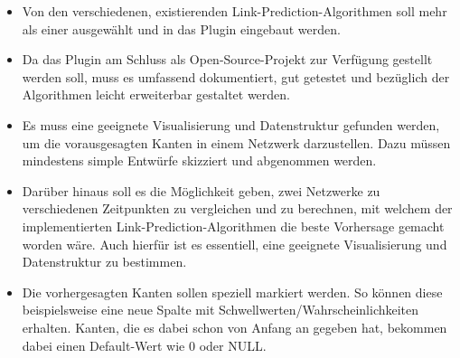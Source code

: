\begin{itemize}
    \item Von den verschiedenen, existierenden Link-Prediction-Algorithmen soll mehr als einer ausgewählt und in das Plugin eingebaut werden.
    \item Da das Plugin am Schluss als Open-Source-Projekt zur Verfügung gestellt werden soll, muss es umfassend dokumentiert, gut getestet und bezüglich der Algorithmen leicht erweiterbar gestaltet werden.
    \item Es muss eine geeignete Visualisierung und Datenstruktur gefunden werden, um die vorausgesagten Kanten in einem Netzwerk darzustellen. Dazu müssen mindestens simple Entwürfe skizziert und abgenommen werden.
    \item Darüber hinaus soll es die Möglichkeit geben, zwei Netzwerke zu verschiedenen Zeitpunkten zu vergleichen und zu berechnen, mit welchem der implementierten Link-Prediction-Algorithmen die beste Vorhersage gemacht worden wäre. Auch hierfür ist es essentiell, eine geeignete Visualisierung und Datenstruktur zu bestimmen.
    \item Die vorhergesagten Kanten sollen speziell markiert werden. So können diese beispielsweise eine neue Spalte mit Schwellwerten/Wahrscheinlichkeiten erhalten. Kanten, die es dabei schon von Anfang an gegeben hat, bekommen dabei einen Default-Wert wie 0 oder NULL.
\end{itemize}

\newpage


